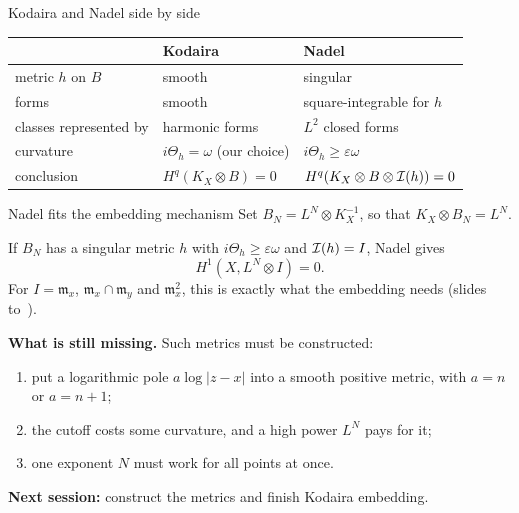 \begin{frame}{Kodaira and Nadel side by side}
\begin{center}
\renewcommand{\arraystretch}{1.6}
\begin{tabular}{l|l|l}
& Kodaira & Nadel\\\hline
metric \(h\) on \(B\) & smooth & singular\\
forms & smooth & square-integrable for \(h\)\\
classes represented by & harmonic forms & \(L^2\) closed forms\\
curvature & \(i\Theta_h=\omega\) (our choice) & \(i\Theta_h\ge\varepsilon\omega\)\\
conclusion & \(H^q(K_X\otimes B)=0\) & \(H^q(K_X\otimes B\otimes\mathcal I(h))=0\)
\end{tabular}
\end{center}
\end{frame}

\begin{frame}{Nadel fits the embedding mechanism}
Set \(B_N=L^N\otimes K_X^{-1}\), so that \(K_X\otimes B_N=L^N\).
\par\medskip
If \(B_N\) has a singular metric \(h\) with \(i\Theta_h\ge\varepsilon\omega\) and \(\mathcal I(h)=I\), Nadel gives
\[
\boxed{H^1(X,L^N\otimes I)=0.}
\]
For \(I=\mathfrak m_x\), \(\mathfrak m_x\cap\mathfrak m_y\) and \(\mathfrak m_x^2\), this is exactly what the embedding needs (slides~\hyperlink{fr:an-embedding-needs-values-10}{\pageref{fr:an-embedding-needs-values-10}} to~\hyperlink{fr:the-task-is-a-12}{\pageref{fr:the-task-is-a-12}}).
\par
\textbf{What is still missing.} Such metrics must be constructed:
\begin{enumerate}
\item put a logarithmic pole \(a\log|z-x|\) into a smooth positive metric, with \(a=n\) or \(a=n+1\);
\item the cutoff costs some curvature, and a high power \(L^N\) pays for it;
\item one exponent \(N\) must work for all points at once.
\end{enumerate}
\textbf{Next session:} construct the metrics and finish Kodaira embedding.
\end{frame}


